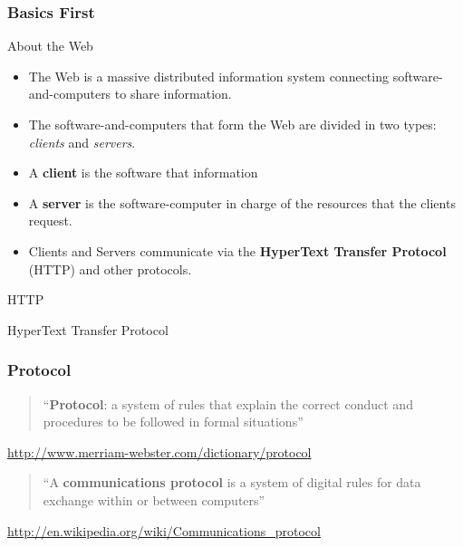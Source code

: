 \documentclass{beamer}\usepackage[]{graphicx}\usepackage[]{color}
\begin{document}

\begin{frame}
\frametitle{Basics First}

\begin{block}{About the Web}
\begin{itemize}
 \item The Web is a massive distributed information system connecting software-and-computers to share information.
 \item The software-and-computers that form the Web are divided in two types: \textit{clients} and \textit{servers}.
 \item A \textbf{client} is the software that  information \\
 \item A \textbf{server} is the software-computer in charge of  the resources that the clients request.
 \item Clients and Servers communicate via the \textbf{HyperText Transfer Protocol} (HTTP) and other protocols.
\end{itemize}
\end{block}

\end{frame}


\begin{frame}
 \begin{center}
  {\Huge \textcolor{mandarina}{HTTP}}
  
  \bigskip
  {\Large \textcolor{mandarina}{HyperText Transfer Protocol}}
 \end{center}
\end{frame}


\begin{frame}
\frametitle{Protocol}

\begin{quotation}
``\textbf{Protocol}: a system of rules that explain the correct conduct and procedures to be followed in formal situations''
\end{quotation}

{\footnotesize 
\hspace{8mm} \url{http://www.merriam-webster.com/dictionary/protocol}
}

\vspace{10mm}

\begin{quotation}
``A \textbf{communications protocol} is a system of digital rules for data exchange within or between computers''
\end{quotation}

{\footnotesize 
\hspace{8mm} \url{http://en.wikipedia.org/wiki/Communications_protocol}
}

\end{frame}
\end{document}
